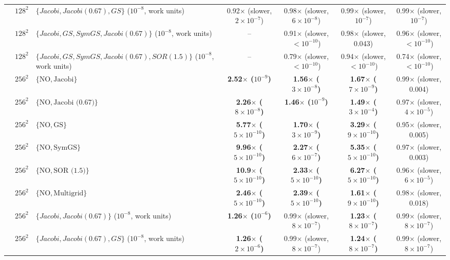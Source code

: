 {\begin{tabular}{lllcccc}
 & $128^2$ & $\{Jacobi, Jacobi (0.67), GS\}$ ($10^{-8}$, work units) & 0.92$\times$ (slower, $2\times10^{-7}$) & 0.98$\times$ (slower, $6\times10^{-8}$) & 0.99$\times$ (slower, $10^{-7}$) & 0.99$\times$ (slower, $10^{-7}$) \\
 & $128^2$ & $\{Jacobi, GS, SymGS, Jacobi (0.67)\}$ ($10^{-8}$, work units) & -- & 0.91$\times$ (slower, $<10^{-10}$) & 0.98$\times$ (slower, 0.043) & 0.96$\times$ (slower, $<10^{-10}$) \\
 & $128^2$ & $\{Jacobi, GS, SymGS, Jacobi (0.67), SOR (1.5)\}$ ($10^{-8}$, work units) & -- & 0.79$\times$ (slower, $<10^{-10}$) & 0.94$\times$ (slower, $<10^{-10}$) & 0.74$\times$ (slower, $<10^{-10}$) \\
 & $256^2$ & $\{\mathrm{NO}, \text{Jacobi}\}$ & \textbf{2.52$\times$ ($10^{-9}$)} & \textbf{1.56$\times$ ($3\times10^{-8}$)} & \textbf{1.67$\times$ ($7\times10^{-9}$)} & 0.99$\times$ (slower, 0.004) \\
 & $256^2$ & $\{\mathrm{NO}, \text{Jacobi (0.67)}\}$ & \textbf{2.26$\times$ ($8\times10^{-8}$)} & \textbf{1.46$\times$ ($10^{-9}$)} & \textbf{1.49$\times$ ($3\times10^{-4}$)} & 0.97$\times$ (slower, $4\times10^{-5}$) \\
 & $256^2$ & $\{\mathrm{NO}, \text{GS}\}$ & \textbf{5.77$\times$ ($5\times10^{-10}$)} & \textbf{1.70$\times$ ($3\times10^{-9}$)} & \textbf{3.29$\times$ ($9\times10^{-10}$)} & 0.95$\times$ (slower, 0.005) \\
 & $256^2$ & $\{\mathrm{NO}, \text{SymGS}\}$ & \textbf{9.96$\times$ ($5\times10^{-10}$)} & \textbf{2.27$\times$ ($6\times10^{-7}$)} & \textbf{5.35$\times$ ($5\times10^{-10}$)} & 0.97$\times$ (slower, 0.003) \\
 & $256^2$ & $\{\mathrm{NO}, \text{SOR (1.5)}\}$ & \textbf{10.9$\times$ ($5\times10^{-10}$)} & \textbf{2.33$\times$ ($5\times10^{-10}$)} & \textbf{6.27$\times$ ($5\times10^{-10}$)} & 0.96$\times$ (slower, $6\times10^{-5}$) \\
 & $256^2$ & $\{\mathrm{NO}, \text{Multigrid}\}$ & \textbf{2.46$\times$ ($5\times10^{-10}$)} & \textbf{2.39$\times$ ($5\times10^{-10}$)} & \textbf{1.61$\times$ ($9\times10^{-10}$)} & 0.98$\times$ (slower, 0.018) \\
 & $256^2$ & $\{Jacobi, Jacobi (0.67)\}$ ($10^{-8}$, work units) & \textbf{1.26$\times$ ($10^{-6}$)} & 0.99$\times$ (slower, $8\times10^{-7}$) & \textbf{1.23$\times$ ($8\times10^{-7}$)} & 0.99$\times$ (slower, $8\times10^{-7}$) \\
 & $256^2$ & $\{Jacobi, Jacobi (0.67), GS\}$ ($10^{-8}$, work units) & \textbf{1.26$\times$ ($2\times10^{-6}$)} & 0.99$\times$ (slower, $8\times10^{-7}$) & \textbf{1.24$\times$ ($8\times10^{-7}$)} & 0.99$\times$ (slower, $8\times10^{-7}$) \\

\end{tabular}}
